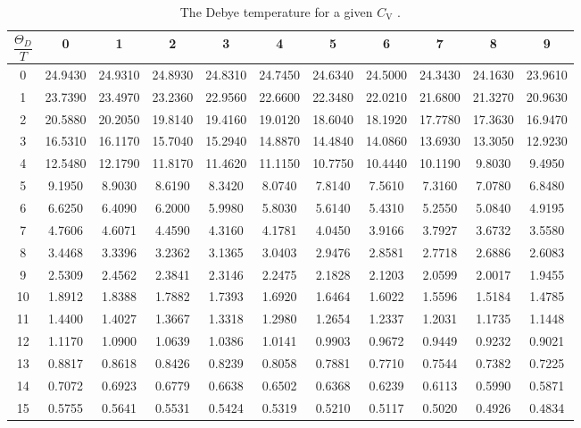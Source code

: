 \begin{table}[H]
\centering
\caption{The Debye temperature for a given $C_\text{V}$  \cite{v47}.}
\label{tab:Debye}
\begin{adjustbox}{width=1\textwidth}
\begin{tabular}{c | c c c c c c c c c c}
\toprule
 $\dfrac{\Theta_D}{T} $ &0 & 1 & 2 &3 & 4 & 5&6 & 7 & 8 &9\\
\midrule
    0 &24.9430  &24.9310   &24.8930   &24.8310&   24.7450&   24.6340&   24.5000&   24.3430&   24.1630&   23.9610\\
    1 &23.7390  &23.4970   &23.2360   &22.9560&   22.6600&   22.3480&   22.0210&   21.6800&   21.3270&   20.9630\\
    2 &20.5880  &20.2050   &19.8140   &19.4160&   19.0120&   18.6040&   18.1920&   17.7780&   17.3630&   16.9470\\
    3 &16.5310  &16.1170   &15.7040   &15.2940&   14.8870&   14.4840&   14.0860&   13.6930&   13.3050&   12.9230\\
    4 &12.5480  &12.1790   &11.8170   &11.4620&   11.1150&   10.7750&   10.4440&   10.1190&   9.8030&    9.4950 \\
    5 &9.1950   &8.9030    &8.6190    &8.3420&    8.0740&    7.8140&    7.5610&    7.3160&    7.0780&    6.8480 \\
    6 &6.6250   &6.4090    &6.2000    &5.9980&    5.8030&    5.6140&    5.4310&    5.2550&    5.0840&    4.9195 \\
    7 &4.7606   &4.6071    &4.4590    &4.3160&    4.1781&    4.0450&    3.9166&    3.7927&    3.6732&    3.5580 \\
    8 &3.4468   &3.3396    &3.2362    &3.1365&    3.0403&    2.9476&    2.8581&    2.7718&    2.6886&    2.6083 \\
    9 &2.5309   &2.4562    &2.3841    &2.3146&    2.2475&    2.1828&    2.1203&    2.0599&    2.0017&    1.9455 \\
    10 &1.8912   &1.8388    &1.7882    &1.7393&    1.6920&    1.6464&    1.6022&    1.5596&    1.5184&    1.4785 \\
    11&1.4400   &1.4027    &1.3667    &1.3318&    1.2980&    1.2654&    1.2337&    1.2031&    1.1735&    1.1448 \\
    12 &1.1170   &1.0900    &1.0639    &1.0386&    1.0141&    0.9903&    0.9672&    0.9449&    0.9232&    0.9021 \\
    13 &0.8817   &0.8618    &0.8426    &0.8239&    0.8058&    0.7881&    0.7710&    0.7544&    0.7382&    0.7225 \\
    14 &0.7072   &0.6923    &0.6779    &0.6638&    0.6502&    0.6368&    0.6239&    0.6113&    0.5990&    0.5871 \\
    15 &0.5755   &0.5641    &0.5531    &0.5424&    0.5319&    0.5210&    0.5117&    0.5020&    0.4926&    0.4834 \\
    \bottomrule
\end{tabular}
\end{adjustbox}
\end{table}
